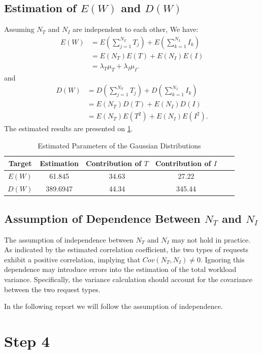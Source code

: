 \documentclass[10pt,a4paper]{article}
\begin{document}
	\subsection{Estimation of $E(W)$ and $D(W)$}
	Assuming $N_T$ and $N_I$ are independent to each other, We have:
	\[
		\begin{aligned}
		E(W)
		&= E\left(\sum_{j=1}^{N_T}T_j\right)
		 + E\left(\sum_{k=1}^{N_I}I_k\right)\\
		&= E(N_T)E(T)+E(N_I)E(I)\\
		&= \lambda_T\mu_T+\lambda_I\mu_I.
		\end{aligned}
	\]
	and
	\[
	\begin{aligned}
		D(W)
		&= D\left(\sum_{j=1}^{N_T} T_j\right)
		+ D\left(\sum_{k=1}^{N_I} I_k\right)\\
		&= E(N_T)D(T)+E(N_I)D(I)\\
		&= E(N_T)E(T^2)+E(N_I)E(I^2).
	\end{aligned}
	\]
	The estimated results are presented on \cref{tab:W_estimation}.
	\begin{table}[H]
		\centering
		\caption{Estimated Parameters of the Gaussian Distributions}
		\label{tab:W_estimation}
		\begin{tabular}{cccccc}
			\hline
			Target & Estimation & Contribution of $T$ & Contribution of $I$\\
			\hline
			$E(W)$ & 61.845   & 34.63 & 27.22 \\
			\hline
			$D(W)$ & 389.6947 & 44.34 &  345.44

		\end{tabular}
	\end{table}

	\subsection{Assumption of Dependence Between $N_T$ and $N_I$}

	The assumption of independence between $N_T$ and $N_I$ may not hold in practice. As indicated by the estimated correlation coefficient, the two types of requests exhibit a positive correlation, implying that $Cov(N_T,N_I)\neq 0$. Ignoring this dependence may introduce errors into the estimation of the total workload variance. Specifically, the variance calculation should account for the covariance between the two request types.
	
	In the following report we will follow the assumption of independence.
	

	\section{Step 4}
	
\end{document}
